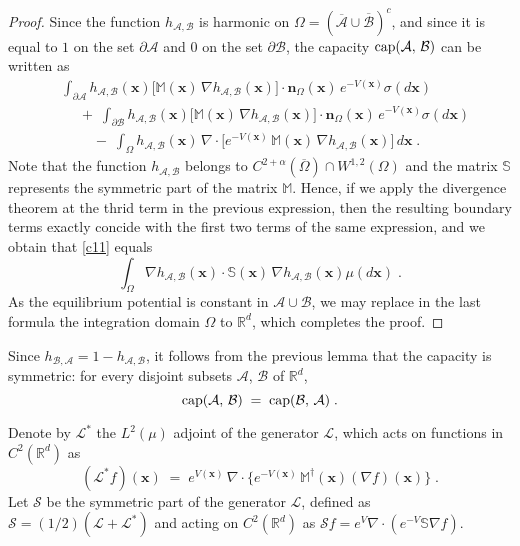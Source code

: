 \documentclass[reqno]{amsart}
\newcounter{as}[section]
\newcommand{\mc}[1]{{\mathcal #1}}
\newcommand{\bb}[1]{{\mathbb #1}}
\newcommand{\bs}[1]{{\boldsymbol #1}}
\newcommand{\<}{\langle}
\renewcommand{\>}{\rangle}
\renewcommand{\Cap}{{\rm cap}}
\begin{document}
\begin{proof}
Since the function $h_{\mc A,\mc B}$ is harmonic on $\Omega =
(\overline{\mc A}\cup \overline{\mc B})^c$, and since it
is equal to $1$ on the set $\partial \mc A$ and $0$ on
the set $\partial \mc B$, the capacity $\Cap (\mc A,\,\mc B)$ can be written as
\begin{equation}
\label{c11}
\begin{aligned}
& \int_{\partial \mc A} h_{\mc A,\mc B}(\bs{x})  \big[ \bb M(\bs{x}) \, \nabla
h_{\mc A,\mc B}(\bs{x}) \big] \cdot \bs n_{\Omega}(\bs{x})  \, e^{-V(\bs{x})} \sigma(d\bs{x}) \\
&\quad \;+\;
\int_{\partial \mc B} h_{\mc A,\mc B}(\bs{x}) \big[ \bb M(\bs{x}) \, \nabla
h_{\mc A,\mc B}(\bs{x}) \big] \cdot \bs n_{\Omega}(\bs{x})  \, e^{-V(\bs{x})} \sigma(d\bs{x}) \\
&\qquad \;-\;
\int_{\Omega} h_{\mc A,\mc B}(\bs{x}) \, \nabla \cdot \big[ e^{-V(\bs{x})} \, \bb M(\bs{x})
\, \nabla h_{\mc A,\mc B}(\bs{x}) \big] \, d\bs{x} \;.
\end{aligned}
\end{equation}
Note that the function $h_{\mc A,\mc B}$ belongs to
$C^{2+\alpha}(\overline{\Omega})\cap W^{1,2}(\Omega)$ and the matrix
$\bb S$ represents the symmetric part of the matrix $\bb M$. Hence, if
we apply the divergence theorem at the thrid term in the previous
expression, then the resulting boundary terms exactly concide with the
first two terms of the same expression, and we obtain that \eqref{c11}
equals
\begin{equation*}
\int_{\Omega} \nabla h_{\mc A,\mc B}(\bs{x}) \cdot \bb{S}(\bs x) \,\nabla h_{\mc A,\mc B} (\bs{x}) \mu (d\bs x)\;.
\end{equation*}
As the equilibrium potential is constant in $\mc A\cup \mc B$, we may replace
in the last formula the integration domain $\Omega$ to $\bb R^d$, which
completes the proof.
\end{proof}

Since $h_{\mc B,\mc A} = 1-h_{\mc A,\mc B}$, it follows from the previous lemma that
the capacity is symmetric: for every disjoint subsets $\mc A$, $\mc B$ of $\bb
R^d$,
\begin{equation}
\label{08}
\Cap (\mc A,\,\mc B) \;=\; \Cap (\mc B,\,\mc A) \;.
\end{equation}


\smallskip{}  Denote by $\mathcal L^*$
the $L^2(\mu)$ adjoint of the generator $\mathcal L$, which acts on
functions in $C^2(\bb R^d)$ as
\begin{equation*}
(\mathcal L^* f) (\bs{x}) \;=\; e^{V(\bs{x})} \, \nabla \cdot \big\{ e^{-V(\bs{x})}
\, \bb M^\dagger(\bs{x}) (\nabla f)(\bs{x}) \big\} \;.
\end{equation*}
Let $\mathcal S$ be the symmetric part of the generator $\mathcal L$,
defined as $\mathcal S = (1/2) (\mathcal L + \mathcal L^*)$ and acting
on $C^2(\mathbb R^d)$ as $\mathcal S f= e^V \nabla \cdot (e^{-V}\mathbb
S \nabla f)$.
\end{document}
